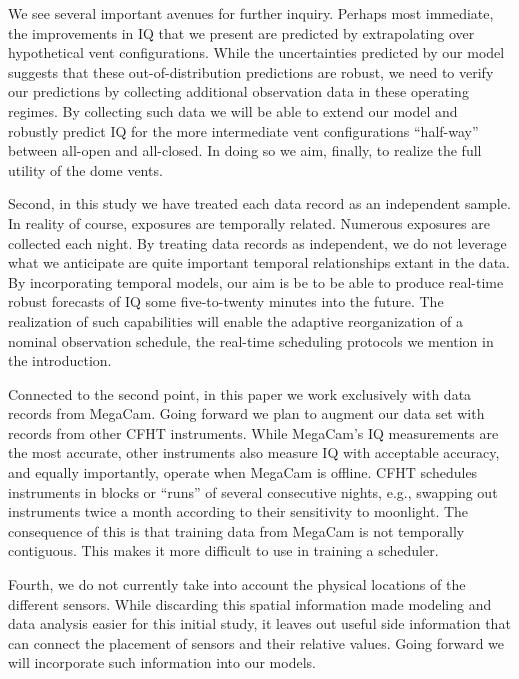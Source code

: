 We see several important avenues for further inquiry. Perhaps most immediate, the improvements in IQ that we present are predicted by extrapolating over hypothetical vent configurations.  While the uncertainties predicted by our model suggests that these out-of-distribution predictions are robust, we need to verify our predictions by collecting additional observation data in these operating regimes. By collecting such data we will be able to extend our model and robustly predict IQ for the more intermediate vent configurations ``half-way'' between all-open and all-closed.  In doing so we aim, finally, to realize the full utility of the dome vents.

Second, in this study we have treated each data record as an independent sample.  In reality of course, exposures are temporally related.  Numerous exposures are collected each night. By treating data records as independent, we do not leverage what we anticipate are quite important temporal relationships extant in the data. By incorporating temporal models, our aim is be to be able to produce real-time robust forecasts of IQ some five-to-twenty minutes into the future.  The realization of such capabilities will enable the adaptive reorganization of a nominal observation schedule, the real-time scheduling protocols we mention in the introduction. 

Connected to the second point, in this paper we work exclusively with data records from MegaCam.  Going forward we plan to augment our data set with records from other CFHT instruments. While MegaCam's IQ measurements are the most accurate, other instruments also measure IQ with acceptable accuracy, and equally importantly, operate when MegaCam is offline. CFHT schedules instruments in blocks or ``runs'' of several consecutive nights, e.g., swapping out instruments twice a month according to their sensitivity to moonlight. The consequence of this is that training data from MegaCam is not temporally contiguous. This makes it more difficult to use in training a scheduler.

Fourth, we do not currently take into account the physical locations of the different sensors. While discarding this spatial information made modeling and data analysis easier for this initial study, it leaves out useful side  information that can connect the placement of sensors and their relative values.  Going forward we will incorporate such information into our models.

